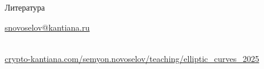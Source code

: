 \documentclass{beamer}
\begin{document}
\begin{frame}{Литература}
    \nocite{CohenFrey+2005}
    \nocite{Washington2008}
    \printbibliography
    
    \begin{center}
        \begin{tcolorbox}[enhanced,hbox,colback=block-green-color-bg,colframe=subsection-color!120,title=Контакты,center title]
            \begin{varwidth}{\textwidth}
                \begin{center}
                    \href{mailto:snovoselov@kantiana.ru}{snovoselov@kantiana.ru}
                \end{center}
            \end{varwidth}
        \end{tcolorbox}	
    \end{center}

\\
{\footnotesize
    \href{https://crypto-kantiana.com/semyon.novoselov/teaching/elliptic_curves_2025}{crypto-kantiana.com/semyon.novoselov/teaching/elliptic\_curves\_2025}
}
\end{frame}
\end{document}
